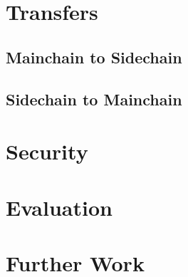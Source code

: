 \documentclass{article}   %
\begin{document}
\section{Transfers}

\subsection{Mainchain to Sidechain}

\subsection{Sidechain to Mainchain}

\section{Security}

\section{Evaluation}

\section{Further Work}



\newpage

 
\end{document}
